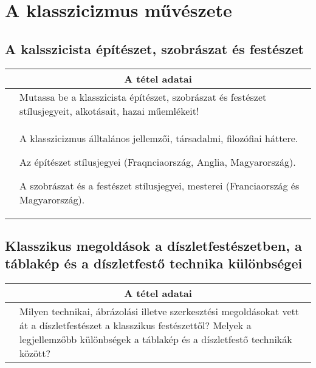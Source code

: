 \chapter{A klasszicizmus művészete} %
\label{ch:12_klasszicizmus}

\section{A kalsszicista építészet, szobrászat és festészet}

\begin{center}
	\begin{longtable}{ | p{} | p{} | }
		
		\hline
		\multicolumn{2}{|c|}{\textbf{A tétel adatai}}
		\\ \hline
		\hline
		
		\centering{Tétel teljes címe}
		&
		Mutassa be a klasszicista építészet, szobrászat és festészet stílusjegyeit, alkotásait, hazai műemlékeit!
		\\ \hline
		
		\centering{Jegyzetek}
		&
		\begin{compactitem}
			\item A klasszicizmus álltalános jellemzői, társadalmi, filozófiai háttere.
			\item Az építészet stílusjegyei (Fraqnciaország, Anglia, Magyarország).
			\item A szobrászat és a festészet stílusjegyei, mesterei (Franciaország és Magyarország).
		\end{compactitem}
		\\\hline
		
	\end{longtable}
\end{center}

\cleardoublepage


\section{Klasszikus megoldások a díszletfestészetben, a táblakép és a díszletfestő technika különbségei}
\begin{center}
	\begin{longtable}{ | p{} | p{} | }
		
		\hline
		\multicolumn{2}{|c|}{\textbf{A tétel adatai}}
		\\ \hline
		\hline
		
		\centering{Tétel teljes címe} 
		&
		Milyen technikai, ábrázolási illetve szerkesztési megoldásokat vett át a díszletfestészet a klasszikus festészettől? Melyek a legjellemzőbb különbségek a táblakép és a díszletfestő technikák között?
		\\ \hline
		
	\end{longtable}
\end{center}
